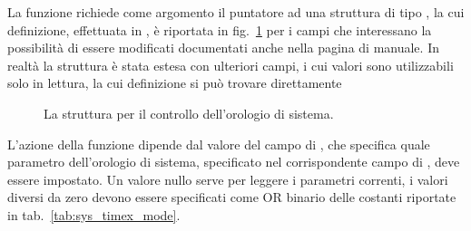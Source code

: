 La funzione richiede come argomento il puntatore ad una struttura di tipo
, la cui definizione, effettuata in , è
riportata in fig.~\ref{fig:sys_timex_struct} per i campi che interessano la
possibilità di essere modificati documentati anche nella pagina di manuale. In
realtà la struttura è stata estesa con ulteriori campi, i cui valori sono
utilizzabili solo in lettura, la cui definizione si può trovare direttamente

\begin{figure}[!htb]
  \footnotesize \centering
  \begin{minipage}[c]{\textwidth}
  \end{minipage} 
  \normalsize 
  \caption{La struttura  per il controllo dell'orologio di
    sistema.} 
  \label{fig:sys_timex_struct}
\end{figure}

L'azione della funzione dipende dal valore del campo 
di , che specifica quale parametro dell'orologio di sistema,
specificato nel corrispondente campo di , deve essere
impostato. Un valore nullo serve per leggere i parametri correnti, i valori
diversi da zero devono essere specificati come OR binario delle costanti
riportate in tab.~\ref{tab:sys_timex_mode}.

